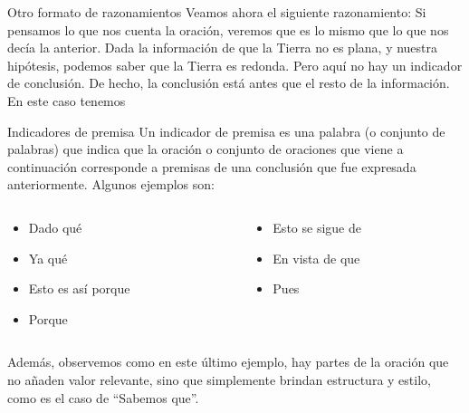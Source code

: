 
\begin{frame}{Otro formato de razonamientos}
  Veamos ahora el siguiente razonamiento:
  \jump
  \jump
  Si pensamos lo que nos cuenta la oración, veremos que es lo mismo que lo que
  nos decía la anterior. Dada la información de que la Tierra no es plana, y
  nuestra hipótesis, podemos saber que la Tierra es redonda.
  \jump
  Pero aquí no hay un indicador de conclusión. De hecho, la conclusión está
  antes que el resto de la información. En este caso tenemos 
\end{frame}


\begin{frame}{Indicadores de premisa}
  Un indicador de premisa es una palabra (o conjunto de palabras) que indica
  que la oración o conjunto de oraciones que viene a continuación corresponde
  a premisas de una conclusión que fue expresada anteriormente.
  \jump
  Algunos ejemplos son:
  \begin{columns}
    \begin{column}{0.5\textwidth}
      \begin{itemize}
        \item Dado qué
        \item Ya qué
        \item Esto es así porque
        \item Porque
      \end{itemize}
    \end{column}
    \begin{column}{0.5\textwidth}
      \begin{itemize}
        \item Esto se sigue de 
        \item En vista de que 
        \item Pues
      \end{itemize}
    \end{column}
  \end{columns}
  \jump
  Además, observemos como en este último ejemplo, hay partes de la oración que
  no añaden valor relevante, sino que simplemente brindan estructura y estilo,
  como es el caso de ``Sabemos que''.
\end{frame}

